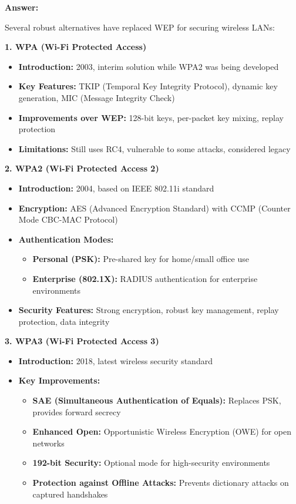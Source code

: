 \documentclass[12pt,a4paper]{article}
\begin{document}
\textbf{Answer:}

Several robust alternatives have replaced WEP for securing wireless LANs:

\textbf{1. WPA (Wi-Fi Protected Access)}
\begin{itemize}
    \item \textbf{Introduction:} 2003, interim solution while WPA2 was being developed
    \item \textbf{Key Features:} TKIP (Temporal Key Integrity Protocol), dynamic key generation, MIC (Message Integrity Check)
    \item \textbf{Improvements over WEP:} 128-bit keys, per-packet key mixing, replay protection
    \item \textbf{Limitations:} Still uses RC4, vulnerable to some attacks, considered legacy
\end{itemize}

\textbf{2. WPA2 (Wi-Fi Protected Access 2)}
\begin{itemize}
    \item \textbf{Introduction:} 2004, based on IEEE 802.11i standard
    \item \textbf{Encryption:} AES (Advanced Encryption Standard) with CCMP (Counter Mode CBC-MAC Protocol)
    \item \textbf{Authentication Modes:}
    \begin{itemize}
        \item \textbf{Personal (PSK):} Pre-shared key for home/small office use
        \item \textbf{Enterprise (802.1X):} RADIUS authentication for enterprise environments
    \end{itemize}
    \item \textbf{Security Features:} Strong encryption, robust key management, replay protection, data integrity
\end{itemize}

\textbf{3. WPA3 (Wi-Fi Protected Access 3)}
\begin{itemize}
    \item \textbf{Introduction:} 2018, latest wireless security standard
    \item \textbf{Key Improvements:}
    \begin{itemize}
        \item \textbf{SAE (Simultaneous Authentication of Equals):} Replaces PSK, provides forward secrecy
        \item \textbf{Enhanced Open:} Opportunistic Wireless Encryption (OWE) for open networks
        \item \textbf{192-bit Security:} Optional mode for high-security environments
        \item \textbf{Protection against Offline Attacks:} Prevents dictionary attacks on captured handshakes
    \end{itemize}
\end{itemize}
\end{document}
